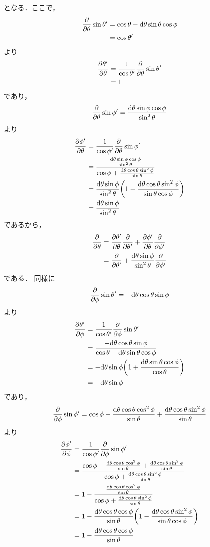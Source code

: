 \documentclass[uplatex]{jsarticle}
\begin{document}
となる．ここで，
\begin{align*}
	\pdv{\theta}\sin\theta'
	&= \cos\theta - \dd\theta\sin\theta\cos\phi \\
	&= \cos\theta'
\end{align*}
より
\begin{align*}
	\pdv{\theta'}{\theta}
	&= \frac{1}{\cos\theta'}\pdv{\theta}\sin\theta' \\
	&= 1
\end{align*}
であり，
\[
	\pdv{\theta}\sin\phi' = \frac{\dd\theta\sin\phi\cos\phi}{\sin^2\theta}
\]
より
\begin{align*}
	\pdv{\phi'}{\theta}
	&= \frac{1}{\cos\phi'}\pdv{\theta}\sin\phi' \\
	&= \frac{\frac{\dd\theta\sin\phi\cos\phi}{\sin^2\theta}}{\cos\phi + \frac{\dd\theta\cos\theta\sin^2\phi}{\sin\theta}} \\
	&= \frac{\dd\theta\sin\phi}{\sin^2\theta}\biggl(1 - \frac{\dd\theta\cos\theta\sin^2\phi}{\sin\theta\cos\phi}\biggr) \\
	&= \frac{\dd\theta\sin\phi}{\sin^2\theta}
\end{align*}
であるから，
\begin{align*}
	\pdv{\theta}
	&= \pdv{\theta'}{\theta}\pdv{\theta'} + \pdv{\phi'}{\theta}\pdv{\phi'} \\
	&= \pdv{\theta'} + \frac{\dd\theta\sin\phi}{\sin^2\theta} \pdv{\phi'}
\end{align*}
である．
同様に
\[
	\pdv{\phi}\sin\theta' = -\dd\theta\cos\theta\sin\phi
\]
より
\begin{align*}
	\pdv{\theta'}{\phi}
	&= \frac{1}{\cos\theta'}\pdv{\phi}\sin\theta' \\
	&= \frac{-\dd\theta\cos\theta\sin\phi}{\cos\theta - \dd\theta\sin\theta\cos\phi} \\
	&= -\dd\theta\sin\phi\biggl(1 + \frac{\dd\theta\sin\theta\cos\phi}{\cos\theta}\biggr) \\
	&= -\dd\theta\sin\phi
\end{align*}
であり，
\[
	\pdv{\phi}\sin\phi' = \cos\phi - \frac{\dd\theta\cos\theta\cos^2\phi}{\sin\theta} + \frac{\dd\theta\cos\theta\sin^2\phi}{\sin\theta}
\]
より
\begin{align*}
	\pdv{\phi'}{\phi}
	&= \frac{1}{\cos\phi'}\pdv{\phi}\sin\phi' \\
	&= \frac{
		\cos\phi - \frac{\dd\theta\cos\theta\cos^2\phi}{\sin\theta} + \frac{\dd\theta\cos\theta\sin^2\phi}{\sin\theta}
	}{
		\cos\phi + \frac{\dd\theta\cos\theta\sin^2\phi}{\sin\theta}
	} \\
	&= 1 - \frac{
		\frac{\dd\theta\cos\theta\cos^2\phi}{\sin\theta}
	}{
		\cos\phi + \frac{\dd\theta\cos\theta\sin^2\phi}{\sin\theta}
	} \\
	&= 1 - \frac{\dd\theta\cos\theta\cos\phi}{\sin\theta} \biggl( 1 - \frac{\dd\theta\cos\theta\sin^2\phi}{\sin\theta\cos\phi} \biggr) \\
	&= 1 - \frac{\dd\theta\cos\theta\cos\phi}{\sin\theta}
\end{align*}
\end{document}
